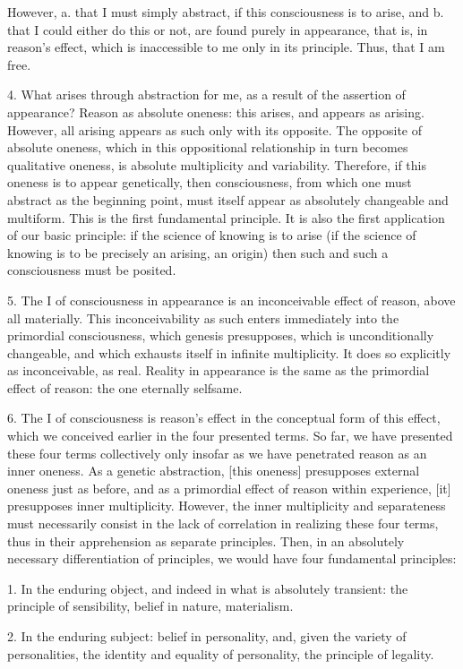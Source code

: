 However, a. that I must simply abstract,
if this consciousness is to arise,
and b. that I could either do this or not,
are found purely in appearance, that is,
in reason’s effect,
which is inaccessible to me
only in its principle.
Thus, that I am free.

4. What arises through abstraction for me,
as a result of the assertion of appearance?
Reason as absolute oneness:
this arises, and appears as arising.
However, all arising appears as such
only with its opposite.
The opposite of absolute oneness,
which in this oppositional relationship
in turn becomes qualitative oneness,
is absolute multiplicity and variability.
Therefore, if this oneness is
to appear genetically,
then consciousness,
from which one must abstract as the beginning point,
must itself appear
as absolutely changeable and multiform.
This is the first fundamental principle.
It is also the first application of our basic principle:
if the science of knowing is to arise
(if the science of knowing is to be
precisely an arising, an origin)
then such and such a consciousness must be posited.

5. The I of consciousness in appearance is
an inconceivable effect of reason,
above all materially.
This inconceivability as such
enters immediately into
the primordial consciousness,
which genesis presupposes,
which is unconditionally changeable,
and which exhausts itself in infinite multiplicity.
It does so explicitly as inconceivable, as real.
Reality in appearance is
the same as the primordial effect of reason:
the one eternally selfsame.

6. The I of consciousness is reason’s effect
in the conceptual form of this effect,
which we conceived earlier in the four presented terms.
So far, we have presented these four terms
collectively only insofar as we have
penetrated reason as an inner oneness.
As a genetic abstraction, [this oneness] presupposes
external oneness just as before,
and as a primordial effect of reason within experience,
[it] presupposes inner multiplicity.
However, the inner multiplicity and separateness must
necessarily consist in the lack of correlation
in realizing these four terms,
thus in their apprehension as separate principles.
Then, in an absolutely necessary differentiation of principles,
we would have four fundamental principles:

1. In the enduring object,
and indeed in what is absolutely transient:
the principle of sensibility, belief in nature, materialism.

2. In the enduring subject:
belief in personality,
and, given the variety of personalities,
the identity and equality of personality,
the principle of legality.


